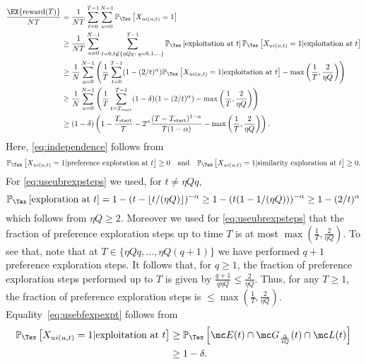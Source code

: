\documentclass{article}
\newcommand\arewardT{\EX{\mathrm{reward}(T)}}
\renewcommand\PR[2][\Tex]{
\ifthenelse{\equal{#1}{}}{{\mathbb P}\left[#2\right]}{\ensuremath{{\mathbb P}_{#1}\left[ #2\right]}}}
\begin{document}
\begin{align}
\frac{\arewardT}{NT} 
%
&=  \frac{1}{NT} \sum_{t=0}^{T-1} \sum_{u=0}^{N-1} \PR{X_{u i(u,t)}=1} 
\nonumber \\
%
&\geq 
\frac{1}{NT} 
\sum_{u=0}^{N-1}
\sum_{t=0, t \notin \{ \eta Q q\colon q=0,1,\ldots \} }^{T-1} 
\PR{ \text{exploitation at $t$} } \PR{X_{u i(u,t)}=1 | \text{exploitation at $t$}} \label{eq:independence} \\
%
&\geq
\frac{1}{N}  \sum_{u=0}^{N-1}
\left(
\frac{1}{T}
\sum_{t=0}^{T-1}
(1 - (2/t)^{\alpha}) \PR{X_{u i(u,t)}=1 | \text{exploitation at $t$}}  
- 
\max \left( \frac{1}{T} , \frac{2}{\eta Q} \right)
\right)
\label{eq:useubrexpsteps}\\
%
&\geq
\frac{1}{N}  \sum_{u=0}^{N-1}
\left(
\frac{1}{T}
\sum_{t=T_{\text{start}}}^{T-1}
(1-\delta) (1 - (2/t)^{\alpha} )
- 
\max \left( \frac{1}{T} , \frac{2}{\eta Q} \right)
\right)
\label{eq:usebfexpexpt} \\
%
&\geq (1-\delta) \left( 1 - \frac{T_{\text{start}} }{T} 
- 2^\alpha \frac{ (T - T_{\text{start}})^{1-\alpha} }{T(1-\alpha)} 
- \max \left( \frac{1}{T} , \frac{2}{\eta Q} \right)
\right) \label{eq:uselbsum}.
\end{align}
Here, \eqref{eq:independence} follows from 
\[
\PR{X_{u i(u,t)}=1| \text{preference exploration at $t$} } \geq 0 
\quad \text{and} \quad
\PR{X_{u i(u,t)}=1| \text{similarity exploration at $t$} } \geq 0. 
\]
For
\eqref{eq:useubrexpsteps} we used, for $t\neq \eta Q q$, 
\[
\PR{\text{exploration at $t$}} 
= 1-(t- \lfloor t /(\eta Q)\rfloor )^{-\alpha}
\geq 1 - (t(1 - 1 /(\eta Q)))^{-\alpha}
\geq 1 - (2/t)^\alpha
\] 
which follows from $\eta Q \geq 2$. 
Moreover we used for \eqref{eq:useubrexpsteps} that the fraction of preference exploration steps up to time  $T$ is at most $\max( \frac{1}{T} , \frac{2}{\eta Q})$. 
To see that, note that at $T \in \{\eta Qq,\ldots,  \eta Q(q+1)\}$ we have performed $q+1$ preference exploration steps. 
It follows that, for $q\geq 1$, the fraction of preference exploration steps performed up to $T$ is given by
$\frac{q+1}{q \eta Q} \leq \frac{2}{\eta Q}$. 
Thus, for any $T\geq 1$, the fraction of preference exploration steps is $\leq \max( \frac{1}{T} , \frac{2}{\eta Q})$. 
Equality~\eqref{eq:usebfexpexpt} follows from 
\begin{align}
\PR{X_{u i(u,t)}=1 | \text{exploitation at $t$}}
&\geq 
\PR{\mc E(t) \cap \mc G_{\frac{\Delta}{4Q}}(t) \cap  \mc L(t)} \nonumber \\
&\geq 1-\delta. 
\label{eq:probEutge1de}
\end{align}
\end{document}
